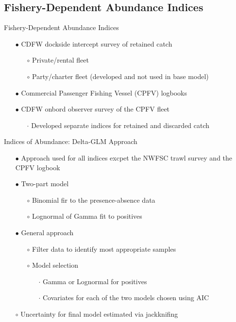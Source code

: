 \documentclass[ignorenonframetext,compress]{beamer}
\begin{document}
\subsection{Fishery-Dependent Abundance
Indices}\label{fishery-dependent-abundance-indices}

\begin{frame}{Fishery-Dependent Abundance Indices}

\begin{itemize}
\item[$\bullet$] CDFW dockside intercept survey of retained catch
\begin{itemize}
\item[$\circ$] Private/rental fleet
\item[$\circ$] Party/charter fleet (developed and not used in base model)
\end{itemize}
\item[$\bullet$] Commercial Passenger Fishing Vessel (CPFV) logbooks 
\item[$\bullet$] CDFW onbord observer survey of the CPFV fleet
\begin{itemize}
\item[$\cdot$] Developed separate indices for retained and discarded catch 
\end{itemize}
\end{itemize}

\end{frame}

\begin{frame}{Indices of Abundance: Delta-GLM Approach}

\begin{itemize}
\item[$\bullet$] Approach used for all indices excpet the NWFSC trawl survey and the CPFV logbook 
\item[$\bullet$] Two-part model
\begin{itemize}
\item[$\circ$] Binomial fir to the presence-absence data
\item[$\circ$] Lognormal of Gamma fit to positives
\end{itemize}
\item[$\bullet$] General approach 
\begin{itemize}
\item[$\circ$] Filter data to identify most appropriate samples 
\item[$\circ$] Model selection
\begin{itemize}
\item[$\cdot$] Gamma or Lognormal for positives
\item[$\cdot$] Covariates for each of the two models chosen using AIC
\end{itemize}
\end{itemize}
\item[$\circ$] Uncertainty for final model estimated via jackknifing 
\end{itemize}

\end{frame}
\end{document}
